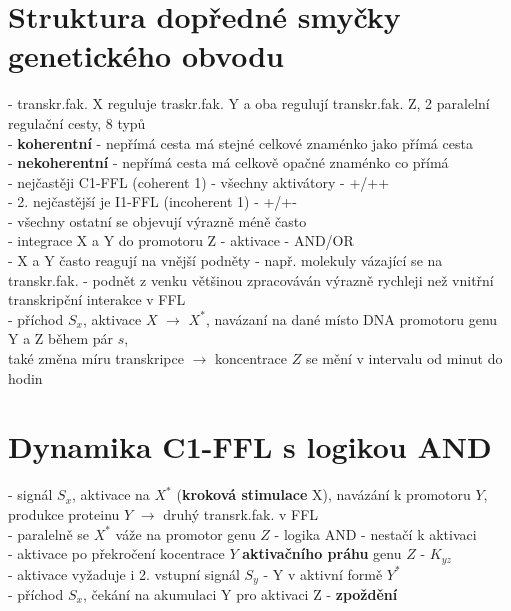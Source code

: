 \documentclass[11pt,a4paper]{report}
\begin{document}
\section{Struktura dopředné smyčky genetického obvodu}
- transkr.fak. X reguluje traskr.fak. Y a oba regulují transkr.fak. Z, 2 paralelní regulační cesty, 8 typů\\ 
\indent - \textbf{koherentní} - nepřímá cesta má stejné celkové znaménko jako přímá cesta\\
\indent - \textbf{nekoherentní} - nepřímá cesta má celkově opačné znaménko co přímá\\
- nejčastěji C1-FFL (coherent 1) - všechny aktivátory - +/++\\
- 2. nejčastější je I1-FFL (incoherent 1) - +/+-\\
- všechny ostatní se objevují výrazně méně často\\
- integrace X a Y do promotoru Z - aktivace - AND/OR\\
- X a Y často reagují na vnější podněty - např. molekuly vázající se na transkr.fak.
- podnět z venku většinou zpracováván výrazně rychleji než vnitřní transkripční interakce v FFL\\
- příchod $S_x$, aktivace $X$ $\rightarrow$ $X^*$, navázaní na dané místo DNA promotoru genu Y a Z během pár $s$,\\
\indent také změna míru transkripce $\rightarrow$ koncentrace $Z$ se mění v intervalu od minut do hodin\\

\section{Dynamika C1-FFL s logikou AND}
- signál $S_x$, aktivace na $X^*$ (\textbf{kroková stimulace} X), navázání k promotoru $Y$, produkce proteinu $Y$
\indent $\rightarrow$ druhý transrk.fak. v FFL\\
- paralelně se $X^*$ váže na promotor genu $Z$ - logika AND - nestačí k aktivaci\\
\indent - aktivace po překročení kocentrace $Y$ \textbf{aktivačního práhu} genu $Z$ - $K_{yz}$\\
\indent \indent - aktivace vyžaduje i 2. vstupní signál $S_y$ - Y v aktivní formě $Y^*$\\
- příchod $S_x$, čekání na akumulaci Y pro aktivaci Z - \textbf{zpoždění}\\
\end{document}
